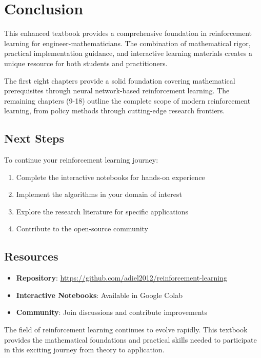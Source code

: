 \documentclass[11pt,twoside,openright]{book}
\begin{document}
\backmatter

\chapter*{Conclusion}

This enhanced textbook provides a comprehensive foundation in reinforcement learning for engineer-mathematicians. The combination of mathematical rigor, practical implementation guidance, and interactive learning materials creates a unique resource for both students and practitioners.

The first eight chapters provide a solid foundation covering mathematical prerequisites through neural network-based reinforcement learning. The remaining chapters (9-18) outline the complete scope of modern reinforcement learning, from policy methods through cutting-edge research frontiers.

\section*{Next Steps}

To continue your reinforcement learning journey:

\begin{enumerate}
\item Complete the interactive notebooks for hands-on experience
\item Implement the algorithms in your domain of interest
\item Explore the research literature for specific applications
\item Contribute to the open-source community
\end{enumerate}

\section*{Resources}

\begin{itemize}
\item \textbf{Repository}: \url{https://github.com/adiel2012/reinforcement-learning}
\item \textbf{Interactive Notebooks}: Available in Google Colab
\item \textbf{Community}: Join discussions and contribute improvements
\end{itemize}

The field of reinforcement learning continues to evolve rapidly. This textbook provides the mathematical foundations and practical skills needed to participate in this exciting journey from theory to application.
\end{document}
